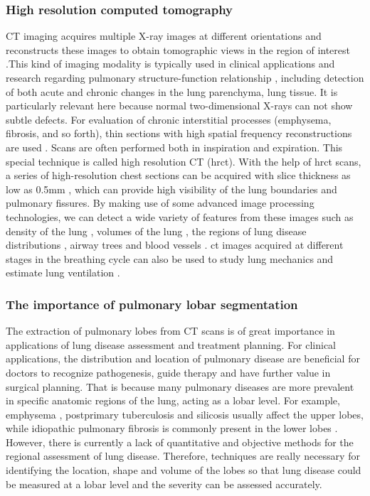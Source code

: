 \subsubsection{High resolution computed tomography}
CT imaging acquires multiple X-ray images at different orientations and reconstructs these images to obtain tomographic views in the region of interest \citep{zhang2011medical}.This kind of imaging modality is typically used in clinical applications and research regarding pulmonary structure-function relationship \citep{hoffman1997assessment}, including detection of both acute and chronic changes in the lung parenchyma, lung tissue. It is particularly relevant here because normal two-dimensional X-rays can not show subtle  defects. For evaluation of chronic interstitial processes (emphysema, fibrosis, and so forth), thin sections with high spatial frequency reconstructions are used \citep{coxson2007computed}. Scans are often performed both in inspiration and expiration. This special technique is called high resolution CT (\gls{hrct}). With the help of \gls{hrct} scans, a series of high-resolution chest sections can be acquired with slice thickness as low as 0.5mm \citep{naidich2005imaging}, which can provide high visibility of the lung boundaries and pulmonary fissures.  By making use of some advanced image processing technologies, we can detect a wide variety of features from these images such as density of the lung \citep{coxson2007computed}, volumes of the lung \citep{hu2001automatic}, the regions of lung disease distributions \citep{el2013computer, ley2008quantitative}, airway trees \citep{graham2010robust, zhu2010automatic, diaz2010airway} and blood vessels \citep{shikata2009segmentation}. \gls{ct} images acquired at different stages in the breathing cycle can also be used to study lung mechanics and estimate lung ventilation \citep{hoffman2006state, yamamoto2011investigation}.

\subsubsection{The importance of pulmonary lobar segmentation}
The extraction of pulmonary lobes from CT scans is of great importance in applications of lung disease assessment and treatment planning. For clinical applications, the distribution and location of pulmonary disease are beneficial for doctors to recognize pathogenesis, guide therapy and have further value in surgical planning. That is because many pulmonary diseases are more prevalent in specific anatomic regions of the lung, acting as a lobar level. For example, emphysema \citep{jeffery1998structural}, postprimary tuberculosis \citep{leung1999pulmonary} and silicosis \citep{rees2007silica} usually affect the upper lobes, while idiopathic pulmonary fibrosis is commonly present in the lower lobes \citep{lin2015combined}. However, there is currently a lack of quantitative and objective methods for the regional assessment of lung disease. Therefore, techniques are really necessary for identifying the location, shape and volume of the lobes so that lung disease could be measured at a lobar level and the severity can be assessed accurately.

